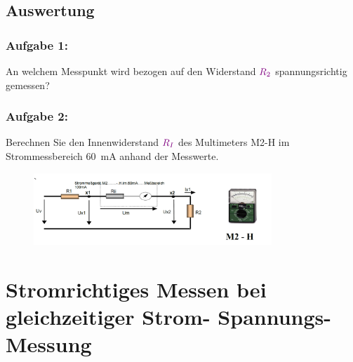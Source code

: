 \documentclass[11pt,a4paper,titlepage,parskip=half]{scrreprt}
\begin{document}
        \subsection{Auswertung}
            \subsubsection{Aufgabe 1:}  An welchem Messpunkt wird bezogen auf den Widerstand $\textcolor{violet}{R_2}$ spannungsrichtig gemessen?
            
     
            
            
            \subsubsection{Aufgabe 2:} Berechnen Sie den Innenwiderstand $\textcolor{violet}{R_I}$ des Multimeters M2-H im Strommessbereich \SI{60}{\milli\ampere} anhand der Messwerte.
            
            \begin{figure}[H]
                \begin{center}
                    \includegraphics[width=0.8\textwidth]{./M21.png}
                \end{center}
            \end{figure}
        
    
        \section{Stromrichtiges Messen bei gleichzeitiger Strom- Spannungs- Messung}
       
\end{document}
